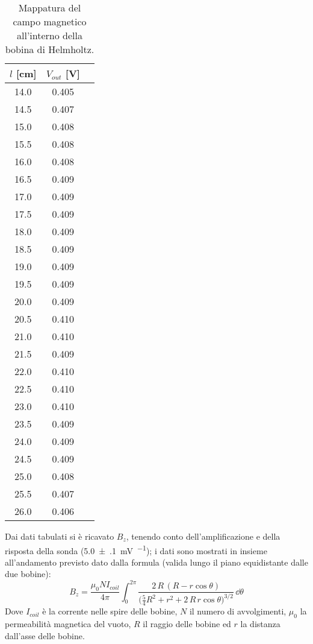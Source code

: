 		\begin{table}[hb]
			\centering
			\begin{tabular}{ccc}
				\toprule
				$l$ [\si{cm}] & 	$V_{out}$ [\si{\volt}] \\
				\midrule
				14.0 		& 	 0.405 \\
				14.5		& 	 0.407 \\
				15.0		& 	 0.408 \\
				15.5		& 	 0.408 \\
				16.0		& 	 0.408 \\
				16.5		& 	 0.409 \\
				17.0		& 	 0.409 \\
				17.5		& 	 0.409 \\
				18.0		& 	 0.409 \\
				18.5		& 	 0.409 \\
				19.0		& 	 0.409 \\
				19.5		& 	 0.409 \\
				20.0		& 	 0.409 \\
				20.5		& 	 0.410 \\
				21.0		& 	 0.410 \\
				21.5		& 	 0.409 \\
				22.0		& 	 0.410 \\
				22.5		& 	 0.410 \\
				23.0		& 	 0.410 \\
				23.5		& 	 0.409 \\
				24.0		& 	 0.409 \\
				24.5		& 	 0.409 \\
				25.0		& 	 0.408 \\
				25.5		& 	 0.407 \\
				26.0		& 	 0.406 \\
				\bottomrule
			\end{tabular}
			\caption{Mappatura del campo magnetico all'interno della bobina di Helmholtz.}
			\label{tab:a}
		\end{table}

	Dai dati tabulati si è ricavato $B_z$, tenendo conto dell'amplificazione e della risposta della sonda
	(\SI{5.0(1)}{\mV\per\gauss}); i dati sono mostrati in  insieme all'andamento previsto
	dato dalla formula (valida lungo il piano equidistante dalle due bobine):
	\begin{equation} \label{eq:bz}
		B_z = \frac{\mu_0 N I_{coil}}{4 \pi} \int_0^{2\pi} \frac{2\, R\, (R - r \cos\theta )}{\big(\frac{5}{4} R^2 + r^2 + 2\, R \, r \cos \theta\big) ^ {3/2}} \, \dd \theta
	\end{equation}
	Dove $I_{coil}$ è la corrente nelle spire delle bobine, $N$ il numero di avvolgimenti,
	$\mu_0$ la permeabilità magnetica del vuoto, $R$ il raggio delle bobine
	ed $r$ la distanza dall'asse delle bobine.

